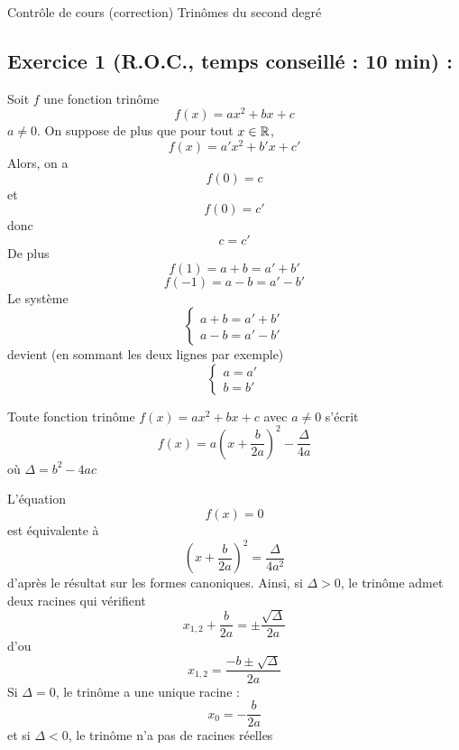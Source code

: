 

\usepackage{tkz-tab}


\center
\Large Contrôle de cours (correction)
\flushleft
\center
Trinômes du second degré 
\flushleft \normalsize
\subsection*{Exercice 1 (R.O.C., temps conseillé : 10 min) : }
Soit $f$ une fonction trinôme 
$$f(x) = ax^2 + bx + c$$ 
$a\neq 0$. On suppose de plus que pour tout $x\in \mathbb{R}$, $$f(x) = a'x^2 +b'x +c'$$ Alors, on a $$f(0) = c$$ et $$f(0) = c'$$ donc $$c=c'$$ De plus $$f(1) = a+b = a'+b'$$ $$f(-1) = a-b = a'-b'$$Le système $$\left\{\begin{array}{l} a+b =a' +b'\\a-b=a'-b'\end{array} \right.$$ devient (en sommant les deux lignes par exemple) $$\left\{\begin{array}{l} a =a'\\b=b'\end{array} \right.$$

Toute fonction trinôme $f(x) = ax^2+bx+c$ avec $a\neq0$ s'écrit $$f(x) = a\left(x+\frac{b}{2a}\right)^2 - \frac{\Delta}{4a}$$ où $\Delta = b^2 -4ac$\newline

L'équation $$f(x) = 0$$ est équivalente à $$\left(x+\frac{b}{2a}\right)^2 = \frac{\Delta}{4a^2}$$ d'après le résultat sur les formes canoniques. Ainsi, si $\Delta > 0$, le trinôme admet deux racines qui vérifient $$x_{1,2} + \frac{b}{2a} = \pm\frac{\sqrt{\Delta}}{2a}$$ d'ou $$x_{1,2} = \frac{-b \pm \sqrt{\Delta}}{2a}$$ Si $\Delta =0$, le trinôme a une unique racine : $$x_0 = -\frac{b}{2a}$$ et si $\Delta < 0$, le trinôme n'a pas de racines réelles
